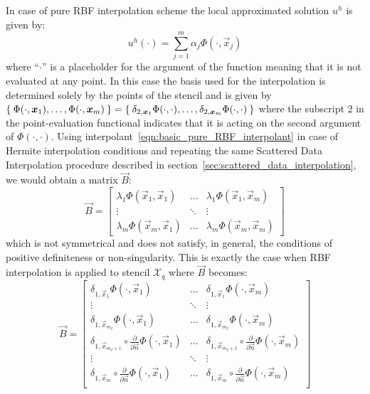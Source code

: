 \smallskip
In case of pure RBF interpolation scheme the local approximated solution $u^h$ is given by:
\begin{equation}
	\label{eqn:basic_pure_RBF_interpolant}
	u^h(\cdot) = \sum_{j=1}^{m} \alpha_j \Phi(\cdot,\vec{x}_j)
\end{equation}
where ``$\cdot$'' is a placeholder for the argument of the function meaning that it is not evaluated at any point. In this case the basis used for the interpolation is determined solely by the points of the stencil and is given by $\Set{\Phi(\cdot,\boldsymbol{x}_1), \dots, \Phi(\cdot,\boldsymbol{x}_m)} = \Set{\delta_{2,\boldsymbol{x}_1}\Phi(\cdot,\cdot), \dots, \delta_{2,\boldsymbol{x}_m}\Phi(\cdot,\cdot)}$ where the subscript $2$ in the point-evaluation functional indicates that it is acting on the second argument of $\Phi(\cdot, \cdot)$. Using interpolant~\eqref{eqn:basic_pure_RBF_interpolant} in case of Hermite interpolation conditions and repeating the same Scattered Data Interpolation procedure described in section~\vref{sec:scattered_data_interpolation}, we would obtain a matrix $\vec{B}$:
\begin{equation}
	\label{eqn:unsymmetric_B}
	\vec{B} = 
	\begin{bmatrix}
		\lambda_1 \Phi(\vec{x}_1, \vec{x}_1)  &  \dots  & \lambda_1 \Phi(\vec{x}_1, \vec{x}_m)  \\
		\vdots								  & \ddots	& \vdots								 \\
		\lambda_m \Phi(\vec{x}_m, \vec{x}_1)  &  \dots  & \lambda_m \Phi(\vec{x}_m, \vec{x}_m)
	\end{bmatrix}
\end{equation}
which is not symmetrical and does not satisfy, in general, the conditions of positive definiteness or non-singularity. This is exactly the case when RBF interpolation is applied to stencil $\mathcal{X}_q$ where $\vec{B}$ becomes:
\begin{equation}
	\label{eqn:unsymmetric_B_RBF-FD}
	\vec{B} = 
	\begin{bmatrix}
		\delta_{1,\vec{x}_1} \Phi(\cdot, \vec{x}_1)  &  \dots  & \delta_{1,\vec{x}_1} \Phi(\cdot, \vec{x}_m)  			\\
		\vdots								  & \ddots	& \vdots								 						\\
		\delta_{1,\vec{x}_{m_I}} \Phi(\cdot, \vec{x}_1)  &  \dots  & \delta_{1,\vec{x}_{m_I}} \Phi(\cdot, \vec{x}_m)	\\
		\delta_{1,\vec{x}_{m_I+1}} \circ \frac{\partial}{\partial \vec{n}} \Phi(\cdot, \vec{x}_1)  &  \dots  & \delta_{1,\vec{x}_{m_I+1}} \circ \frac{\partial}{\partial \vec{n}} \Phi(\cdot, \vec{x}_m)	\\
		\vdots								  & \ddots	& \vdots								 						\\
		\delta_{1,\vec{x}_{m}} \circ \frac{\partial}{\partial \vec{n}} \Phi(\cdot, \vec{x}_1)  &  \dots  & \delta_{1,\vec{x}_{m}} \circ \frac{\partial}{\partial \vec{n}} \Phi(\cdot, \vec{x}_m)	\\
	\end{bmatrix}
\end{equation}
